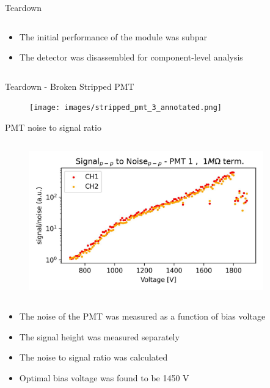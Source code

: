 \begin{columnframe}{Teardown}
\begin{column}{0.5\textwidth}
\begin{figure}
        \end{figure}
        \begin{itemize}
            \item The initial performance of the module was subpar
            \item The detector was disassembled for component-level analysis
        \end{itemize}
    \end{column}
\end{columnframe}

\begin{frame}{Teardown - Broken Stripped PMT}
    \begin{figure}
        \centering
        \texttt{[image: images/stripped\_pmt\_3\_annotated.png]}
    \end{figure}
\end{frame}


\begin{columnframe}{PMT noise to signal ratio}
    \begin{column}{0.5\textwidth}
        \begin{figure}
            \centering
            \includegraphics[width=0.9\textwidth, frame]{images/sigp2p_to_noisep2p.jpg}
        \end{figure}
    \end{column}
    \begin{column}{0.5\textwidth}
        \begin{itemize}
            \item The noise of the PMT was measured as a function of bias voltage
            \item The signal height was measured separately
            \item The noise to signal ratio was calculated
            \item Optimal bias voltage was found to be 1450 \si{\volt}
        \end{itemize}
    \end{column}
\end{columnframe}


